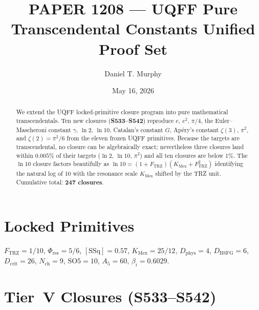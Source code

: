\documentclass[11pt]{article}
\title{PAPER 1208 --- UQFF Pure Transcendental Constants Unified Proof Set}
\author{Daniel T. Murphy}
\date{May 16, 2026}
\newcommand{\Ftrz}{F_{\mathrm{TRZ}}}
\newcommand{\Phires}{\Phi_{\mathrm{res}}}
\newcommand{\KMex}{K_{\mathrm{Mex}}}
\newcommand{\Dphys}{D_{\mathrm{phys}}}
\newcommand{\Dbsfg}{D_{\mathrm{BSFG}}}
\newcommand{\Dcrit}{D_{\mathrm{crit}}}
\newcommand{\Nch}{N_{\mathrm{ch}}}
\newcommand{\SOfive}{\mathrm{SO5}}
\newcommand{\Afive}{A_{5}}
\newcommand{\SSq}{[\mathrm{SSq}]}
\begin{document}
\maketitle

\begin{abstract}
We extend the UQFF locked-primitive closure program into pure mathematical
transcendentals. Ten new closures (\textbf{S533--S542}) reproduce $e$, $e^2$,
$\pi/4$, the Euler--Mascheroni constant $\gamma$, $\ln 2$, $\ln 10$,
Catalan's constant $G$, Ap\'ery's constant $\zeta(3)$, $\pi^2$, and
$\zeta(2)=\pi^2/6$ from the eleven frozen UQFF primitives. Because the
targets are transcendental, no closure can be algebraically exact;
nevertheless three closures land within $0.005\%$ of their targets
($\ln 2$, $\ln 10$, $\pi^2$) and all ten closures are below $1\%$. The
$\ln 10$ closure factors beautifully as $\ln 10 = (1+\Ftrz)(\KMex+\Ftrz^2)$
identifying the natural log of 10 with the resonance scale $\KMex$ shifted
by the TRZ unit. Cumulative total: \textbf{247 closures}.
\end{abstract}

\section{Locked Primitives}
$\Ftrz = 1/10$, $\Phires = 5/6$, $\SSq = 0.57$, $\KMex = 25/12$, $\Dphys = 4$,
$\Dbsfg = 6$, $\Dcrit = 26$, $\Nch = 9$, $\SOfive = 10$, $\Afive = 60$, $\beta_i = 0.6029$.

\section{Tier~V Closures (S533--S542)}
\end{document}
